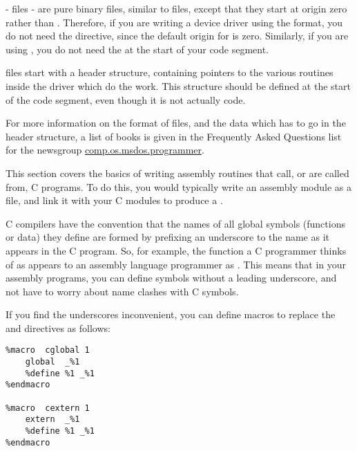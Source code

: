 
 -  files - are pure binary files,
similar to  files, except that they start at origin zero
rather than . Therefore, if you are writing a device driver
using the  format, you do not need the  directive,
since the default origin for  is zero. Similarly, if you are
using , you do not need the  at the start of
your code segment.

 files start with a header structure, containing pointers to
the various routines inside the driver which do the work. This
structure should be defined at the start of the code segment, even
though it is not actually code.

For more information on the format of  files, and the data
which has to go in the header structure, a list of books is given in
the Frequently Asked Questions list for the newsgroup
\href{news:comp.os.msdos.programmer}{comp.os.msdos.programmer}.


This section covers the basics of writing assembly routines that
call, or are called from, C programs. To do this, you would
typically write an assembly module as a  file, and link it
with your C modules to produce a .


C compilers have the
convention that the names of all global symbols (functions or data)
they define are formed by prefixing an underscore to the name as it
appears in the C program. So, for example, the function a C
programmer thinks of as  appears to an assembly language
programmer as . This means that in your assembly
programs, you can define symbols without a leading underscore, and
not have to worry about name clashes with C symbols.

If you find the underscores inconvenient, you can define macros to
replace the  and  directives as follows:

\begin{lstlisting}
%macro  cglobal 1
    global  _%1
    %define %1 _%1
%endmacro

%macro  cextern 1
    extern  _%1
    %define %1 _%1
%endmacro
\end{lstlisting}

